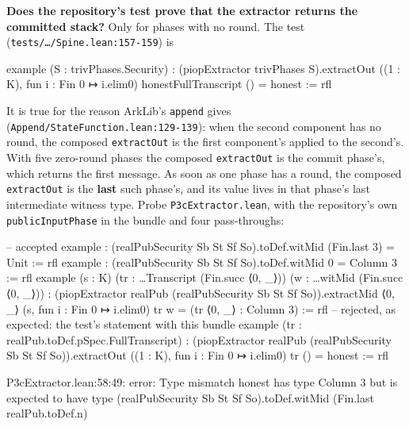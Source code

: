 \textbf{Does the repository's test prove that the extractor returns the committed stack?} Only for phases with no round. The test (\texttt{tests/\allowbreak{}…/\allowbreak{}Spine.\allowbreak{}lean:157-{}159}) is

\begin{leancode}
example (S : trivPhases.Security) :
    (piopExtractor trivPhases S).extractOut ((1 : K), fun i : Fin 0 ↦ i.elim0)
      honestFullTranscript () = honest := rfl
\end{leancode}

It is true for the reason ArkLib's \texttt{append} gives (\texttt{A\allowbreak{}p\allowbreak{}p\allowbreak{}e\allowbreak{}n\allowbreak{}d\allowbreak{}/\allowbreak{}S\allowbreak{}t\allowbreak{}a\allowbreak{}t\allowbreak{}e\allowbreak{}F\allowbreak{}u\allowbreak{}n\allowbreak{}c\allowbreak{}t\allowbreak{}i\allowbreak{}o\allowbreak{}n\allowbreak{}.\allowbreak{}l\allowbreak{}e\allowbreak{}a\allowbreak{}n\allowbreak{}:\allowbreak{}1\allowbreak{}2\allowbreak{}9\allowbreak{}-{}\allowbreak{}1\allowbreak{}3\allowbreak{}9}): when the second component has no round, the composed \texttt{extractOut} is the first component's applied to the second's. With five zero-round phases the composed \texttt{extractOut} is the commit phase's, which returns the first message. As soon as one phase has a round, the composed \texttt{extractOut} is the \textbf{last} such phase's, and its value lives in that phase's last intermediate witness type. Probe \texttt{P3cExtractor.\allowbreak{}lean}, with the repository's own \texttt{publicInputPhase} in the bundle and four pass-throughs:

\begin{leancode}
-- accepted
example : (realPubSecurity Sb St Sf So).toDef.witMid (Fin.last 3) = Unit := rfl
example : (realPubSecurity Sb St Sf So).toDef.witMid 0 = Column 3 := rfl
example (s : K) (tr : …Transcript (Fin.succ ⟨0, _⟩)) (w : …witMid (Fin.succ ⟨0, _⟩)) :
    (piopExtractor realPub (realPubSecurity Sb St Sf So)).extractMid ⟨0, _⟩
      (s, fun i : Fin 0 ↦ i.elim0) tr w = (tr ⟨0, _⟩ : Column 3) := rfl
-- rejected, as expected: the test's statement with this bundle
example (tr : realPub.toDef.pSpec.FullTranscript) :
    (piopExtractor realPub (realPubSecurity Sb St Sf So)).extractOut
      ((1 : K), fun i : Fin 0 ↦ i.elim0) tr () = honest := rfl
\end{leancode}

\begin{srccode}
P3cExtractor.lean:58:49: error: Type mismatch
  honest
has type
  Column 3
but is expected to have type
  (realPubSecurity Sb St Sf So).toDef.witMid (Fin.last realPub.toDef.n)
\end{srccode}

